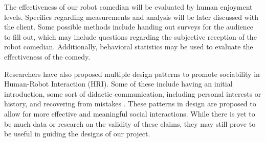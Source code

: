 \documentclass[onecolumn, draftclsnofoot,10pt, compsoc]{IEEEtran}
\begin{document}
The effectiveness of our robot comedian will be evaluated by human enjoyment levels. Specifics regarding measurements and analysis will be later discussed with the client. Some possible methods include handing out surveys for the audience to fill out, which may include questions regarding the subjective reception of the robot comedian. Additionally, behavioral statistics may be used to evaluate the effectiveness of the comedy.

Researchers have also proposed multiple design patterns to promote sociability in Human-Robot Interaction (HRI). Some of these include having an initial introduction, some sort of didactic communication, including personal interests or history, and recovering from mistakes \cite{Kahn:2008}. These patterns in design are proposed to allow for more effective and meaningful social interactions. While there is yet to be much data or research on the validity of these claims, they may still prove to be useful in guiding the designs of our project.
\end{document}
